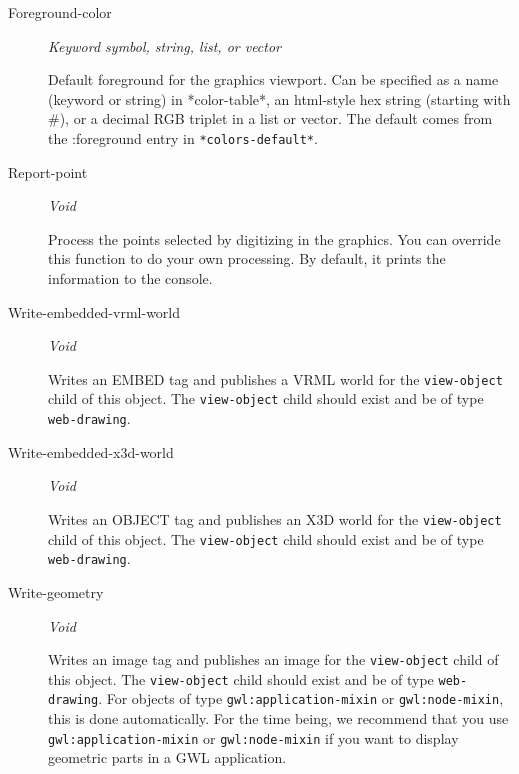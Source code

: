 \documentclass [11pt]{book}
\begin{document}
\begin{itemize}
\begin{description}
\item [Foreground-color]
\emph{Keyword symbol, string, list, or vector}

 Default foreground for the graphics viewport. Can be specified
as a name (keyword or string) in *color-table*, an html-style hex string (starting with \#), or a decimal RGB
triplet in a list or vector. The default comes from the :foreground entry in \texttt{*colors-default*}.




\item [Report-point]
\emph{Void}

 Process the points selected by digitizing in the graphics. You can override this
function to do your own processing. By default, it prints the information to the console.




\item [Write-embedded-vrml-world]
\emph{Void}

 Writes an EMBED tag and publishes a VRML world for the \texttt{view-object} child of this object.
The \texttt{view-object} child should exist and be of type \texttt{web-drawing}.




\item [Write-embedded-x3d-world]
\emph{Void}

 Writes an OBJECT tag and publishes an X3D world for the \texttt{view-object} child of this object.
The \texttt{view-object} child should exist and be of type \texttt{web-drawing}.




\item [Write-geometry]
\emph{Void}

 Writes an image tag and publishes an image for the \texttt{view-object} child of this object.
The \texttt{view-object} child should exist and be of type \texttt{web-drawing}.
For objects of type \texttt{gwl:application-mixin} or \texttt{gwl:node-mixin}, this is done automatically.
For the time being, we recommend that you use \texttt{gwl:application-mixin} or \texttt{gwl:node-mixin} if you want to
display geometric parts in a GWL application.




\end{description}








\end{itemize}
\end{document}
